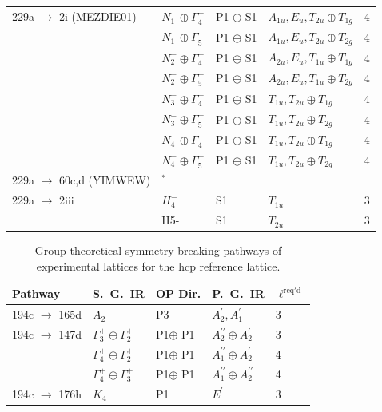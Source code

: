 \documentclass[preprint]{iucr}              %
\begin{document}
\begin{table}
\begin{tabular}{lllll}
229a $\rightarrow$ 2i (MEZDIE01) & $N_1^-\oplus\Gamma_4^+$ &
P1 $\oplus$ S1 & $A_{1u},E_u,T_{2u} \oplus T_{1g}$ & 4\\
& $N_1^-\oplus\Gamma_5^+$ & P1 $\oplus$ S1 & $A_{1u},E_u,T_{2u}
\oplus T_{2g}$ & 4\\
& $N_2^-\oplus\Gamma_4^+$ & P1 $\oplus$ S1 & $A_{2u},E_u,T_{1u}
\oplus T_{1g}$ & 4 \\
& $N_2^-\oplus\Gamma_5^+$ & P1 $\oplus$ S1 & $A_{2u},E_u,T_{1u}
\oplus T_{2g}$ & 4 \\
& $N_3^-\oplus\Gamma_4^+$ & P1 $\oplus$ S1 & $T_{1u},T_{2u} \oplus
T_{1g}$ & 4\\
& $N_3^-\oplus\Gamma_5^+$ & P1 $\oplus$ S1 & $T_{1u},T_{2u} \oplus
T_{2g}$ & 4\\
& $N_4^-\oplus\Gamma_4^+$ & P1 $\oplus$ S1 & $T_{1u},T_{2u} \oplus
T_{1g}$ & 4\\
& $N_4^-\oplus\Gamma_5^+$ & P1 $\oplus$ S1 & $T_{1u},T_{2u} \oplus
T_{2g}$ & 4\\

229a $\rightarrow$ 60c,d (YIMWEW) & $^*$\\

229a $\rightarrow$ 2iii & $H_4^-$ & S1 & $T_{1u}$ & 3\\
& H5- & S1 & $T_{2u}$ & 3\\
\hline
\end{tabular}
\end{table}

\pagebreak

\begin{table}%
\caption{Group theoretical symmetry-breaking pathways of
experimental lattices for the hcp reference
lattice.}\label{pathwaysHCP}\tiny
\begin{tabular}{lllll}\hline
Pathway & S.~G.~IR & OP Dir. & P.~G.~IR & $\ell^{\mathrm{req'd}}$ \\
\hline
194c $\rightarrow$ 165d & $A_2$ & P3 & $A_2^\prime,A_1^\prime$ & 3 \\
194c $\rightarrow$ 147d & $\Gamma_3^+ \oplus \Gamma_2^+$ & P1$ \oplus$ P1 &
$A_2^{\prime\prime}\oplus A_2^\prime$ & 3 \\
& $\Gamma_4^+ \oplus \Gamma_2^+$ & P1$ \oplus$ P1 & $A_1^{\prime\prime}\oplus
A_2^\prime$ & 4 \\
& $\Gamma_4^+ \oplus \Gamma_3^+$ & P1$ \oplus$ P1 & $A_1^{\prime\prime}\oplus
A_2^{\prime\prime}$ & 4 \\
194c $\rightarrow$ 176h & $K_4$ & P1 & $E^\prime$ & 3 \\
\hline
\end{tabular}
\end{table}
\end{document}
